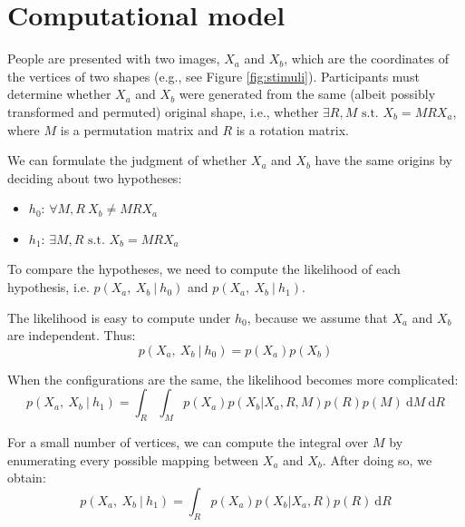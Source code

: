 \documentclass{article} %
\begin{document}


\section{Computational model}

People are presented with two images, $X_a$ and $X_b$, which are the
coordinates of the vertices of two shapes (e.g., see Figure
\ref{fig:stimuli}). Participants must determine whether $X_a$ and
$X_b$ were generated from the same (albeit possibly transformed and
permuted) original shape, i.e., whether $\exists R,M\textrm{ s.t. }
X_b=MRX_a$, where $M$ is a permutation matrix and $R$ is a rotation
matrix.

We can formulate the judgment of whether $X_a$ and $X_b$ have the same
origins by deciding about two hypotheses:

\begin{itemize}
\itemsep1pt\parskip0pt
\item
  $h_0$: $\forall M,R\ X_b\neq MRX_a$
\item
  $h_1$: $\exists M,R\textrm{ s.t. } X_b=MRX_a$
\end{itemize}

To compare the hypotheses, we need to compute the likelihood of each
hypothesis, i.e. $p(X_a,\ X_b\ \vert \ h_0)$ and $p(X_a,\ X_b\ \vert \
h_1)$.

The likelihood is easy to compute under $h_0$, because we assume that
$X_a$ and $X_b$ are independent. Thus:
\begin{equation}
  p(X_a,\ X_b\ \vert \ h_0)=p(X_a)p(X_b)
  \label{eq:lh-h0}
\end{equation}

When the configurations are the same, the likelihood becomes more
complicated:
\begin{equation} 
  p(X_a,\ X_b\ \vert \ h_1)=\int_R\int_M p(X_a) p(X_b\vert X_a,R,M) p(R) p(M)\ \mathrm{d}M\ \mathrm{d}R
\end{equation}

For a small number of vertices, we can compute the integral over $M$
by enumerating every possible mapping between $X_a$ and $X_b$. After
doing so, we obtain:
\begin{equation} 
  p(X_a,\ X_b\ \vert \ h_1)=\int_R p(X_a) p(X_b\vert X_a,R) p(R)\ \mathrm{d}R
\end{equation}
\end{document}
